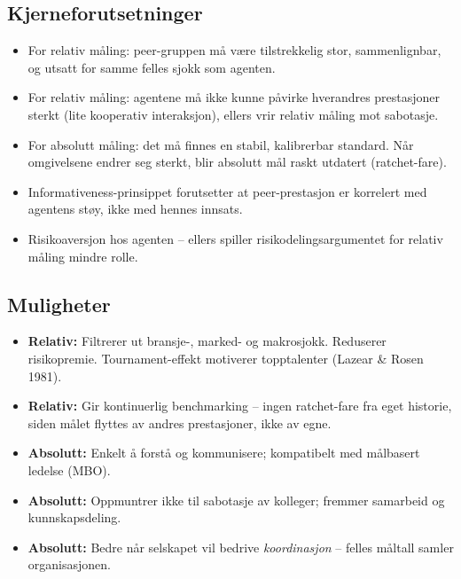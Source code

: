 \subsection*{Kjerneforutsetninger}
\begin{itemize}
\item For relativ måling: peer-gruppen må være tilstrekkelig stor, sammenlignbar, og utsatt for samme felles sjokk som agenten.
\item For relativ måling: agentene må ikke kunne påvirke hverandres prestasjoner sterkt (lite kooperativ interaksjon), ellers vrir relativ måling mot sabotasje.
\item For absolutt måling: det må finnes en stabil, kalibrerbar standard. Når omgivelsene endrer seg sterkt, blir absolutt mål raskt utdatert (ratchet-fare).
\item Informativeness-prinsippet forutsetter at peer-prestasjon er korrelert med agentens støy, ikke med hennes innsats.
\item Risikoaversjon hos agenten -- ellers spiller risikodelingsargumentet for relativ måling mindre rolle.
\end{itemize}

\subsection*{Muligheter}
\begin{itemize}
\item \textbf{Relativ:} Filtrerer ut bransje-, marked- og makrosjokk. Reduserer risikopremie. Tournament-effekt motiverer topptalenter (Lazear \& Rosen 1981).
\item \textbf{Relativ:} Gir kontinuerlig benchmarking -- ingen ratchet-fare fra eget historie, siden målet flyttes av andres prestasjoner, ikke av egne.
\item \textbf{Absolutt:} Enkelt å forstå og kommunisere; kompatibelt med målbasert ledelse (MBO).
\item \textbf{Absolutt:} Oppmuntrer ikke til sabotasje av kolleger; fremmer samarbeid og kunnskapsdeling.
\item \textbf{Absolutt:} Bedre når selskapet vil bedrive \emph{koordinasjon} -- felles måltall samler organisasjonen.
\end{itemize}

